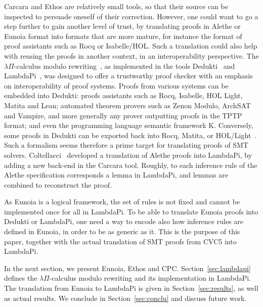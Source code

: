 \documentclass[class=llncs, crop=false]{standalone}
\begin{document}
Carcara and Ethos are relatively small tools, so that their source can
be inspected to persuade oneself of their correction. However, one
could want to go a step further to gain another level of trust, by
translating proofs in Alethe or Eunoia format into formats that are
more mature, for instance the format of proof assistants such as Rocq
or Isabelle/HOL. Such a translation could also help with reusing the
proofs in another context, in an interoperability perspective. The
$\lambda\Pi$-calculus modulo rewriting~\cite{CousineauDowek}, as
implemented in the tools Dedukti~\cite{assaf2023dedukti} and
LambdaPi~\cite{hondet:hal-02981561}, was designed to offer a
trustworthy proof checker with an emphasis on interoperability of
proof systems. Proofs from various systems can be embedded into
Dedukti: proofs assistants such as Rocq, Isabelle, HOL Light, Matita
and Lean; automated theorem provers such as Zenon Modulo, ArchSAT and
Vampire, and more generally any prover outputting proofs in the TPTP
format; and even the programming language semantic framework
K. Conversely, some proofs in Dedukti can be exported back into Rocq,
Matita, or HOL/Light~\cite{DBLP:journals/corr/abs-1807-01873}. Such a formalism seems therefore a prime target
for translating proofs of SMT solvers.
Coltellacci~\cite{coltellacciReconstructionSMTProofs2024a} developed a
translation of Alethe proofs into LambdaPi, by adding a new back-end
in the Carcara tool. Roughly, to each inference rule of the Alethe
specification corresponds a lemma in LambdaPi, and lemmas are combined
to reconstruct the proof.

As Eunoia is a logical framework, the set of rules is not fixed and
cannot be implemented once for all in LambdaPi. To be
able to translate Eunoia proofs into Dedukti or LambdaPi, one need a
way to encode also how inference rules are defined in Eunoia, in order
to be as generic as it. This is the purpose of this paper, together
with the actual translation of SMT proofs from CVC5 into LambdaPi.

In the next section, we present Eunoia, Ethos and
CPC. Section~\ref{sec:lambdapi} defines the $\lambda\Pi$-calculus
modulo rewriting and its implementation in LambdaPi. The translation
from Eunoia to LambdaPi is given in Section~\ref{sec:results}, as well
as actual results. We conclude in Section~\ref{sec:conclu} and discuss
future work.


%
\end{document}

